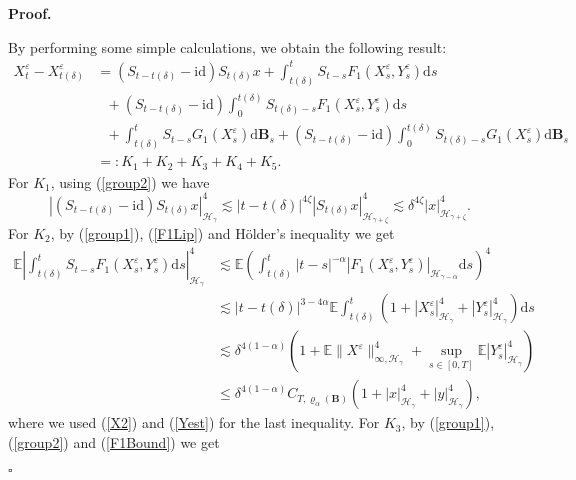 \documentclass[10pt,a4paper]{article}
\numberwithin{equation}{section}
\newenvironment{proof}[1][\normalfont\bfseries Proof]{%
	\noindent #1.\hspace{0.5em}%
	\ignorespaces%
}{%
	\hfill $\square$%
	\par%
}
\begin{document}
\begin{proof}
	By performing some simple calculations, we obtain the following result:
	\begin{align*}
		X_t^\varepsilon-X_{t(\delta)}^\varepsilon &=(S_{t-{t(\delta)}}-\mathrm{id} ) S_{{t(\delta)}}x+\int_{t(\delta)}^t S_{t-s} F_1(X_s^\varepsilon, Y_s^\varepsilon) \mathrm{d} s \nonumber\\
		&~~~+ (S_{t-{t(\delta)}}-\mathrm{id} )\int_0^{t(\delta)} S_{t(\delta)-s} F_1(X_s^\varepsilon, Y_s^\varepsilon) \mathrm{d} s
		\nonumber\\
		&~~~+\int_{t(\delta)}^t S_{t-s} G_1(X_s^\varepsilon) \mathrm{d} \mathbf B_s  +(S_{t-{t(\delta)}}-\mathrm{id} )\int_0^{t(\delta)} S_{t(\delta)-s} G_1(X_s^\varepsilon) \mathrm{d} \mathbf B_s  \nonumber\\
		&=: K_1+K_2+K_3+K_4+K_5.
	\end{align*}
	For $K_1$, using (\ref{group2}) we have
	\begin{equation}\label{Xt}
		|(S_{t-{t(\delta)}}-\mathrm{id} ) S_{{t(\delta)}}x|_{\mathcal H_\gamma }^4
		\lesssim |t-t(\delta)|^{4\zeta} |S_{{t(\delta)}}x|_{\mathcal H_{\gamma+\zeta} }^4
		\lesssim \delta^{4\zeta}  |x|_{\mathcal H_{\gamma+\zeta} }^4.
	\end{equation}
	For $K_2$, by (\ref{group1}), (\ref{F1Lip}) and H\"{o}lder's inequality we get
	\begin{align}\label{Xth1}
		\mathbb E \left |\int_{t(\delta)}^t S_{t-s} F_1(X_s^\varepsilon, Y_s^\varepsilon) \mathrm{d} s \right|_{\mathcal H_\gamma }^4
		&\lesssim \mathbb E \left (  \int_{t(\delta)}^t |t-s|^{-\alpha} | F_1(X_s^\varepsilon, Y_s^\varepsilon)|_{\mathcal H_{\gamma-\alpha} } \mathrm{d} s \right)^4 \nonumber\\
		& \lesssim |t-t(\delta)|^{3-4\alpha}  \mathbb E\int_{t(\delta)}^t (1+|X_s^\varepsilon|_{\mathcal H_\gamma}^4+|Y_s^\varepsilon|_{\mathcal H_\gamma}^4) \mathrm{d} s \nonumber\\
		&\lesssim \delta^{4(1-\alpha)} \left(1+\mathbb E\|X^\varepsilon\|_{\infty,\mathcal H_\gamma}^4+\sup_{s \in [0,T]} \mathbb E|Y_s^\varepsilon|_{\mathcal H_\gamma}^4 \right) \nonumber\\
		&\leq \delta^{4(1-\alpha)} C_{T,\varrho_{\alpha}(\mathbf{B})} (1+|x|_{\mathcal H_\gamma}^4+|y|_{\mathcal H_\gamma}^4),
	\end{align}
	where we used (\ref{X2}) and (\ref{Yest}) for the last inequality.
	For $K_3$, by (\ref{group1}), (\ref{group2}) and (\ref{F1Bound}) we get
	\begin{align}\label{Xth2}

\end{align}
\end{proof}
\end{document}
